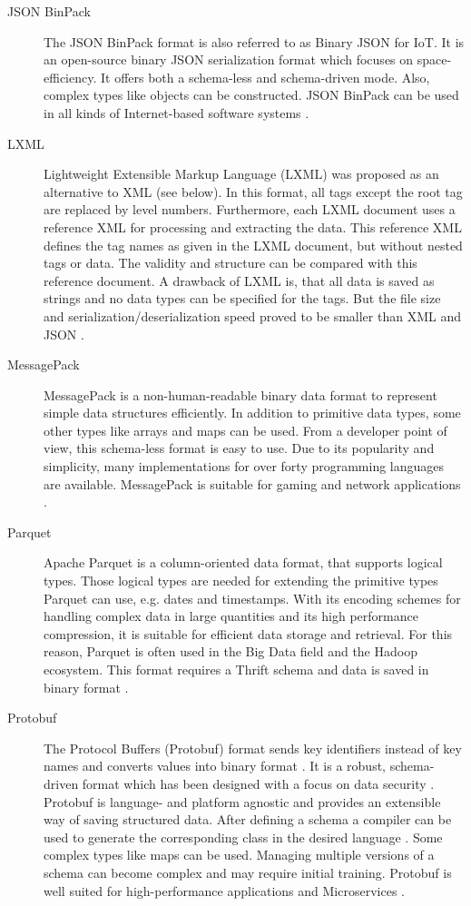 \documentclass[10pt]{IEEEtran}
\begin{document}
\begin{description}
    \item[JSON BinPack] The JSON BinPack format is also referred to as Binary JSON for IoT. It is an open-source binary JSON serialization format which focuses on space-efficiency. It offers both a schema-less and schema-driven mode. Also, complex types like objects can be constructed. JSON BinPack can be used in all kinds of Internet-based software systems \cite{viotti_json_2022}.
    \item[LXML] Lightweight Extensible Markup Language (LXML) was proposed as an alternative to XML (see below). In this format, all tags except the root tag are replaced by level numbers. Furthermore, each LXML document uses a reference XML for processing and extracting the data. This reference XML defines the tag names as given in the LXML document, but without nested tags or data. The validity and structure can be compared with this reference document. A drawback of LXML is, that all data is saved as strings and no data types can be specified for the tags. But the file size and serialization/deserialization speed proved to be smaller than XML and JSON \cite{shameer_2013}.
    \item[MessagePack]  MessagePack is a non-human-readable binary data format to represent simple data structures efficiently. In addition to primitive data types, some other types like arrays and maps can be used. From a developer point of view, this schema-less format is easy to use. Due to its popularity and simplicity, many implementations for over forty programming languages are available. MessagePack is suitable for gaming and network applications \cite{viotti_2022}. 
    \item[Parquet]  Apache Parquet is a column-oriented data format, that supports logical types. Those logical types are needed for extending the primitive types Parquet can use, e.g. dates and timestamps. With its encoding schemes for handling complex data in large quantities and its high performance compression, it is suitable for efficient data storage and retrieval. For this reason, Parquet is often used in the Big Data field and the Hadoop ecosystem. This format requires a Thrift schema and data is saved in binary format \cite{apache_parquet_2025}. 
    \item[Protobuf]  The Protocol Buffers (Protobuf) format sends key identifiers instead of key names and converts values into binary format \cite{lysogor_2018}. It is a robust, schema-driven format which has been designed with a focus on data security \cite{viotti_2022}. Protobuf is language- and platform agnostic and provides an extensible way of saving structured data. After defining a schema a compiler can be used to generate the corresponding class in the desired language \cite{proos_2020}. Some complex types like maps can be used. Managing multiple versions of a schema can become complex and may require initial training. Protobuf is well suited for high-performance applications and Microservices \cite{klimenko_2024}.

\end{description}
\end{document}
